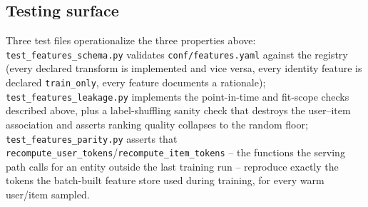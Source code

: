 \subsection{Testing surface}

Three test files operationalize the three properties above:
\texttt{test\_features\_schema.py} validates \texttt{conf/features.yaml}
against the registry (every declared transform is implemented and vice
versa, every identity feature is declared \texttt{train\_only}, every
feature documents a rationale); \texttt{test\_features\_leakage.py}
implements the point-in-time and fit-scope checks described above, plus a
label-shuffling sanity check that destroys the user--item association and
asserts ranking quality collapses to the random floor;
\texttt{test\_features\_parity.py} asserts that
\texttt{recompute\_user\_tokens}/\texttt{recompute\_item\_tokens} -- the
functions the serving path calls for an entity outside the last training
run -- reproduce exactly the tokens the batch-built feature store used
during training, for every warm user/item sampled.
